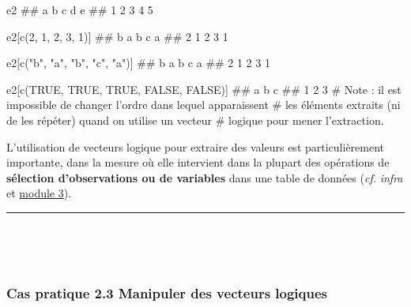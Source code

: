 \documentclass[12pt,twosided, notitlepage]{book}
\newenvironment{Shaded}{}{}
\newcommand{\KeywordTok}[1]{\textcolor[rgb]{0.00,0.00,1.00}{#1}}
\newcommand{\DecValTok}[1]{#1}
\newcommand{\StringTok}[1]{\textcolor[rgb]{0.00,0.50,0.50}{#1}}
\newcommand{\CommentTok}[1]{\textcolor[rgb]{0.00,0.50,0.00}{#1}}
\newcommand{\OtherTok}[1]{\textcolor[rgb]{1.00,0.25,0.00}{#1}}
\newcommand{\NormalTok}[1]{#1}
\renewenvironment{Shaded}{\begin{snugshade}}{\end{snugshade}}
\begin{document}
\begin{Shaded}
\begin{Highlighting}[]
\NormalTok{e2}
\NormalTok{  ## a b c d e }
\NormalTok{  ## 1 2 3 4 5}

\NormalTok{e2[}\KeywordTok{c}\NormalTok{(}\DecValTok{2}\NormalTok{, }\DecValTok{1}\NormalTok{, }\DecValTok{2}\NormalTok{, }\DecValTok{3}\NormalTok{, }\DecValTok{1}\NormalTok{)]}
\NormalTok{  ## b a b c a }
\NormalTok{  ## 2 1 2 3 1}

\NormalTok{e2[}\KeywordTok{c}\NormalTok{(}\StringTok{"b"}\NormalTok{, }\StringTok{"a"}\NormalTok{, }\StringTok{"b"}\NormalTok{, }\StringTok{"c"}\NormalTok{, }\StringTok{"a"}\NormalTok{)]}
\NormalTok{  ## b a b c a }
\NormalTok{  ## 2 1 2 3 1}

\NormalTok{e2[}\KeywordTok{c}\NormalTok{(}\OtherTok{TRUE}\NormalTok{, }\OtherTok{TRUE}\NormalTok{, }\OtherTok{TRUE}\NormalTok{, }\OtherTok{FALSE}\NormalTok{, }\OtherTok{FALSE}\NormalTok{)]}
\NormalTok{  ## a b c }
\NormalTok{  ## 1 2 3}
\CommentTok{# Note : il est impossible de changer l'ordre dans lequel apparaissent}
\CommentTok{# les éléments extraits (ni de les répéter) quand on utilise un vecteur}
\CommentTok{# logique pour mener l'extraction.}
\end{Highlighting}
\end{Shaded}

L'utilisation de vecteurs logique pour extraire des valeurs est
particulièrement importante, dans la mesure où elle intervient dans la
plupart des opérations de \textbf{sélection d'observations ou de
variables} dans une table de données (\emph{cf.} \emph{infra} et
\underline{module 3}).

\begin{center}\rule{0.5\linewidth}{\linethickness}\end{center}

~

~

\subsubsection{\texorpdfstring{\textbf{Cas pratique 2.3} Manipuler des
vecteurs
logiques}{Cas pratique 2.3 Manipuler des vecteurs logiques}}\label{cas-pratique-2.3-manipuler-des-vecteurs-logiques}

\end{document}
